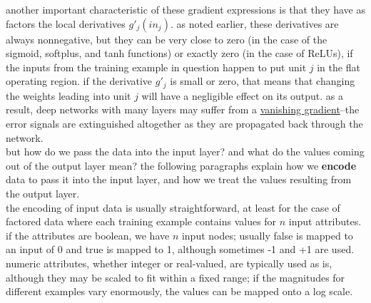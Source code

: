 \documentclass[a4paper,12pt]{article}
\begin{document}
another important characteristic of these gradient expressions is that they have as factors the local derivatives \(g'_j(in_j)\). as noted earlier, these derivatives are always nonnegative, but they can be very close to zero (in the case of the sigmoid, softplus, and tanh functions) or exactly zero (in the case of ReLUs), if the inputs from the training example in question happen to put unit \(j\) in the flat operating region. if the derivative \(g'_j\) is small or zero, that means that changing the weights leading into unit \(j\) will have a negligible effect on its output. as a result, deep networks with many layers may suffer from a \href{20230503170135-vanishing_gradient.org}{vanishing gradient}--the error signals are extinguished altogether as they are propagated back through the network.\\
but how do we pass the data into the input layer? and what do the values coming out of the output layer mean? the following paragraphs explain how we \textbf{encode} data to pass it into the input layer, and how we treat the values resulting from the output layer.\\
the encoding of input data is usually straightforward, at least for the case of factored data where each training example contains values for \(n\) input attributes. if the attributes are boolean, we have \(n\) input nodes; usually false is mapped to an input of 0 and true is mapped to 1, although sometimes -1 and +1 are used. numeric attributes, whether integer or real-valued, are typically used as is, although they may be scaled to fit within a fixed range; if the magnitudes for different examples vary enormously, the values can be mapped onto a log scale.\\
\end{document}
